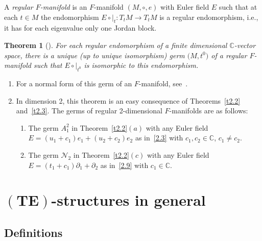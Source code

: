 \documentclass[10pt,a4paper]{amsart}
\numberwithin{equation}{section}
\numberwithin{figure}{section}
\newcommand{\C}{{\mathbb C}}
\newcommand{\NN}{{\mathcal N}}
\newcommand{\paa}{\partial}
\newtheorem{Theorem}{Theorem}[section]
\begin{document}
\begin{Definition}[{\cite[Definition 1.2]{DH17}}]\label{t2.4}
A {\it regular $F$-manifold} is an $F$-manifold
$(M,\circ,e)$ with Euler field $E$ such that at each
$t\in M$ the endomorphism $E\circ|_t\colon T_tM\to T_tM$
is a regular endomorphism, i.e., it has for each eigenvalue
only one Jordan block.
\end{Definition}

\begin{Theorem}[{\cite[Theorem~1.3(ii)]{DH17}}]\label{t2.5}
For each regular endomorphism of a finite dimensional
$\C$-vector space, there is a unique (up to unique
isomorphism) germ $\big(M,t^0\big)$ of a regular $F$-manifold
such that $E\circ|_{t^0}$ is isomorphic to this endomorphism.
\end{Theorem}

\begin{Remarks}\label{t2.6}\qquad
\begin{enumerate}\itemsep=0pt
\item[$(i)$] For a normal form of this germ of an $F$-manifold,
see~\cite[Theorem~1.3(i)]{DH17}.

\item[$(ii)$]
In dimension 2, this theorem is an easy consequence
of Theorems~\ref{t2.2} and~\ref{t2.3}. The germs of
regular 2-dimensional $F$-manifolds are as follows:
\begin{enumerate}\itemsep=0pt%
\item[$(a)$]
The germ $A_1^2$ in Theorem~\ref{t2.2}$(a)$ with any Euler field
$E=(u_1+c_1)e_1+(u_2+c_2)e_2$
as in~\eqref{2.3} with $c_1,c_2\in\C$, $c_1\neq c_2$.
\item[$(b)$]
The germ $\NN_2$ in Theorem~\ref{t2.2}$(c)$ with any Euler field
$E=(t_1+c_1)\paa_1+\paa_2$ as in~\eqref{2.9}
with $c_1\in\C$.
\end{enumerate}
\end{enumerate}
\end{Remarks}

\section[$(TE)$-structures in general]{$\boldsymbol{(TE)}$-structures in general}\label{c3}

\subsection{Definitions}%
\end{document}
